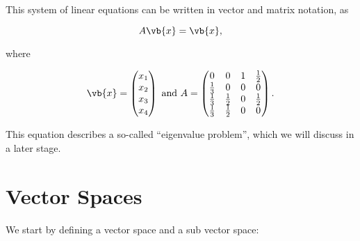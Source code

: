 \documentclass[a4paper,12pt]{report}
\begin{document}
{This system of linear equations can be written in vector and matrix notation, as 

\begin{equation}
    A\vb{x} = \vb{x} ,
\end{equation}

where 

\begin{equation}
    \vb{x} = \begin{pmatrix}
         x_{1} \\
         x_{2} \\
         x_3 \\
         x_4  \\
    \end{pmatrix} \text { and } A = \begin{pmatrix}
        0 & 0 & 1 &  \frac{1}{2} \\
        \frac{1}{3} & 0 & 0 & 0  \\
        \frac{1}{3}  & \frac{1}{2}  & 0 & \frac{1}{2}   \\
        \frac{1}{3}  & \frac{1}{2}  & 0 & 0  \\
    \end{pmatrix}.
\end{equation}

This equation describes a so-called ``eigenvalue problem'', which we will discuss in a later stage.}

\section{Vector Spaces}

We start by defining a vector space and a sub vector space:
\end{document}
